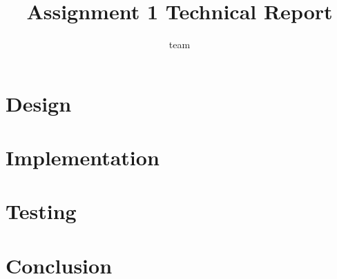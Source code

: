 \documentclass{report}
\title{Assignment 1 Technical Report}
\author{team}
\date{}
\begin{document}
\maketitle
\tableofcontents






\chapter{Design}

\chapter{Implementation}
\chapter{Testing}
\chapter{Conclusion}



\end{document}
